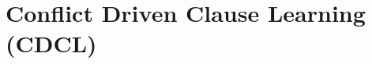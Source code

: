 \documentclass[12pt,openany]{book}
\begin{document}

\tableofcontents
\newpage



\chapter{Conflict Driven Clause Learning (CDCL)}



\newpage
\printbibliography
%
\end{document}

